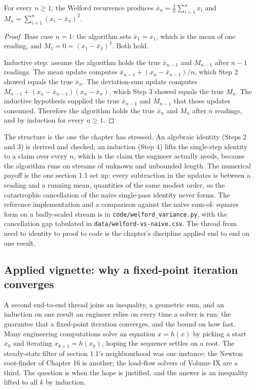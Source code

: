\begin{theorem}
For every $n \geq 1$, the Welford recurrence produces $\bar x_{n} =
\frac{1}{n}\sum_{i=1}^{n} x_{i}$ and $M_{n} = \sum_{i=1}^{n} (x_{i} -
\bar x_{n})^{2}$.
\end{theorem}

\begin{proof}
Base case $n = 1$: the algorithm sets $\bar x_{1} = x_{1}$, which is the
mean of one reading, and $M_{1} = 0 = (x_{1} - \bar x_{1})^{2}$. Both
hold.

Inductive step: assume the algorithm holds the true $\bar x_{n-1}$ and
$M_{n-1}$ after $n - 1$ readings. The mean update computes $\bar
x_{n-1} + (x_{n} - \bar x_{n-1})/n$, which Step 2 showed equals the true
$\bar x_{n}$. The deviation-sum update computes $M_{n-1} + (x_{n} - \bar
x_{n-1})(x_{n} - \bar x_{n})$, which Step 3 showed equals the true
$M_{n}$. The inductive hypothesis supplied the true $\bar x_{n-1}$ and
$M_{n-1}$ that those updates consumed. Therefore the algorithm holds the
true $\bar x_{n}$ and $M_{n}$ after $n$ readings, and by induction for
every $n \geq 1$.
\end{proof}

The structure is the one the chapter has stressed. An algebraic identity
(Steps 2 and 3) is derived and checked; an induction (Step 4) lifts the
single-step identity to a claim over every $n$, which is the claim the
engineer actually needs, because the algorithm runs on streams of
unknown and unbounded length. The numerical payoff is the one section
1.1 set up: every subtraction in the updates is between a reading and a
running mean, quantities of the same modest order, so the catastrophic
cancellation of the naive single-pass identity never forms. The
reference implementation and a comparison against the naive sum-of-
squares form on a badly-scaled stream is in
\texttt{code/welford\_variance.py}, with the cancellation gap tabulated
in \texttt{data/welford-vs-naive.csv}. The thread from need to identity to
proof to code is the chapter's discipline applied end to end on one
result.

\subsection{Applied vignette: why a fixed-point iteration converges}

A second end-to-end thread joins an inequality, a geometric sum, and an
induction on one result an engineer relies on every time a solver is run:
the guarantee that a fixed-point iteration converges, and the bound on
how fast. Many engineering computations solve an equation $x = h(x)$ by
picking a start $x_{0}$ and iterating $x_{k+1} = h(x_{k})$, hoping the
sequence settles on a root. The steady-state filter of section 1.1's
neighbourhood was one instance; the Newton root-finder of Chapter 16 is
another; the load-flow solvers of Volume IX are a third. The question is
when the hope is justified, and the answer is an inequality lifted to all
$k$ by induction.

